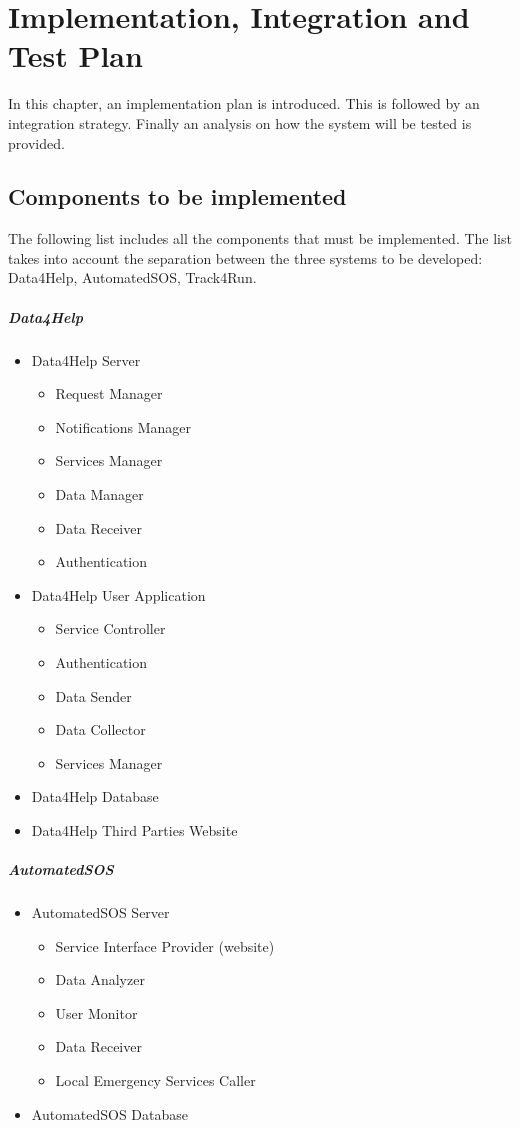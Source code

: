 \documentclass[../DD.tex]{subfiles}
\begin{document}
\chapter{Implementation, Integration and Test Plan}
In this chapter, an implementation plan is introduced. This is followed by an integration strategy. Finally an analysis on how the system will be tested is provided.

\section{Components to be implemented\label{sect:5.1}}
The following list includes all the components that must be implemented. The list takes into account the separation between the three systems to be developed: Data4Help, AutomatedSOS, Track4Run.
\paragraph{Data4Help}
\begin{itemize}
	\item{Data4Help Server}
	\begin{itemize}
		\item{Request Manager}
		\item{Notifications Manager}
		\item{Services Manager}
		\item{Data Manager}
		\item{Data Receiver}
		\item{Authentication}
	\end{itemize}
	\item{Data4Help User Application}
	\begin{itemize}
		\item{Service Controller}
		\item{Authentication}
		\item{Data Sender}
		\item{Data Collector}
		\item{Services Manager}
	\end{itemize}
	\item{Data4Help Database}
	\item{Data4Help Third Parties Website}
\end{itemize}
\paragraph{AutomatedSOS}
\begin{itemize}
	\item{AutomatedSOS Server}
	\begin{itemize}
		\item{Service Interface Provider (website)}
		\item{Data Analyzer}
		\item{User Monitor}
		\item{Data Receiver}
		\item{Local Emergency Services Caller}
	\end{itemize}
	\item{AutomatedSOS Database}
\end{itemize}
\end{document}
